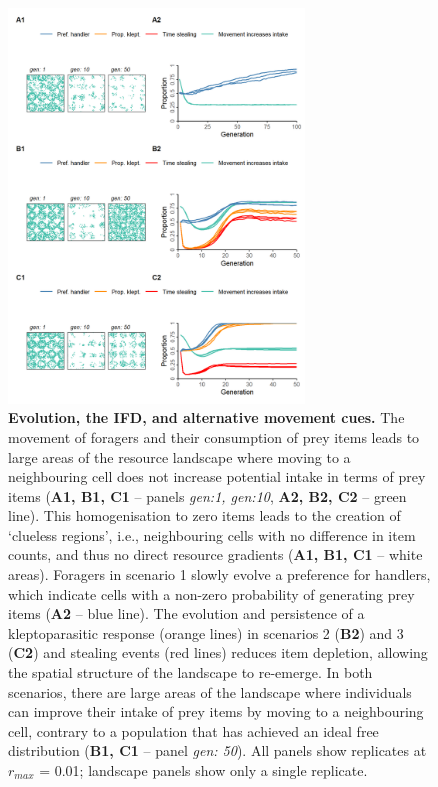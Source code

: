 \documentclass[11pt]{article}
\begin{document}
\begin{figure}[h!]
    \centering
    \includegraphics[width=0.70\textwidth]{figures/fig_05.png}
    \caption{
        \textbf{Evolution, the IFD, and alternative movement cues.}
        The movement of foragers and their consumption of prey items leads to large areas of the resource landscape where moving to a neighbouring cell does not increase potential intake in terms of prey items (\textbf{A1, B1, C1} -- panels \textit{gen:1, gen:10}, \textbf{A2, B2, C2} -- green line).
        This homogenisation to zero items leads to the creation of `clueless regions', i.e., neighbouring cells with no difference in item counts, and thus no direct resource gradients (\textbf{A1, B1, C1} -- white areas).
        Foragers in scenario 1 slowly evolve a preference for handlers, which indicate cells with a non-zero probability of generating prey items (\textbf{A2} -- blue line).
        The evolution and persistence of a kleptoparasitic response (orange lines) in scenarios 2 (\textbf{B2}) and 3 (\textbf{C2}) and stealing events (red lines) reduces item depletion, allowing the spatial structure of the landscape to re-emerge.
        In both scenarios, there are large areas of the landscape where individuals can improve their intake of prey items by moving to a neighbouring cell, contrary to a population that has achieved an ideal free distribution (\textbf{B1, C1} -- panel \textit{gen: 50}).
        All panels show replicates at $r_{max}$ = 0.01; landscape panels show only a single replicate.
    }
    \label{Fig:CluelessLandscape}
\end{figure}
\end{document}
